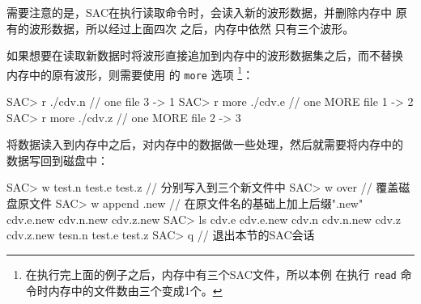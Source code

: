 需要注意的是，SAC在执行读取命令时，会读入新的波形数据，并删除内存中
原有的波形数据，所以经过上面四次  之后，内存中依然
只有三个波形。

如果想要在读取新数据时将波形直接追加到内存中的波形数据集之后，而不替换
内存中的原有波形，则需要使用  的 \texttt{more} 选项
\footnote{在执行完上面的例子之后，内存中有三个SAC文件，所以本例
在执行 \texttt{read} 命令时内存中的文件数由三个变成1个。}：
\begin{SACCode}
SAC> r ./cdv.n              // one file       3 -> 1
SAC> r more ./cdv.e         // one MORE file  1 -> 2
SAC> r more ./cdv.z         // one MORE file  2 -> 3
\end{SACCode}

将数据读入到内存中之后，对内存中的数据做一些处理，然后就需要将内存中的
数据写回到磁盘中：
\begin{SACCode}
SAC> w test.n test.e test.z        // 分别写入到三个新文件中
SAC> w over                        // 覆盖磁盘原文件
SAC> w append .new                 // 在原文件名的基础上加上后缀".new"
cdv.e.new cdv.n.new cdv.z.new
SAC> ls
cdv.e cdv.e.new cdv.n cdv.n.new cdv.z cdv.z.new tesn.n test.e test.z
SAC> q                             // 退出本节的SAC会话
\end{SACCode}
